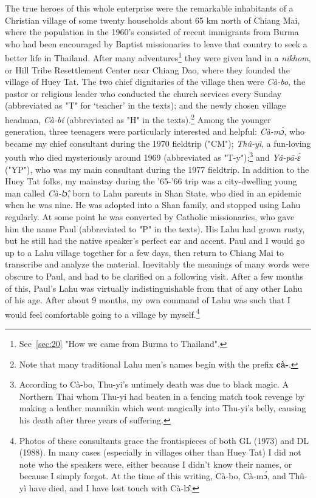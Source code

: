 The true heroes of this whole enterprise were the remarkable
inhabitants of a Christian village of some twenty households about 65
km north of Chiang Mai, where the population in the 1960's consisted
of recent immigrants from Burma who had been encouraged by Baptist
missionaries to leave that country to seek a better life in
Thailand. After many adventures\footnote{See~\ref{sec:20} "How we came
  from Burma to Thailand".} they were given land in a \emph{nikhom},
or Hill Tribe Resettlement Center near Chiang Dao, where they founded
the village of Huey Tat. The two chief dignitaries of the village then
were \emph{Cà-bo}, the pastor or religious leader who conducted the
church services every Sunday (abbreviated as "T" for `teacher' in the
texts); and the newly chosen village headman, \emph{Cà-bí}
(abbreviated as "H" in the texts).\footnote{Note that many traditional
  Lahu men's names begin with the prefix \textbf{cà-}.}  Among the
younger generation, three teenagers were particularly interested and
helpful: \emph{Cà-mɔ́}, who became my chief consultant during the 1970
fieldtrip ("CM"); \emph{Thû-yì}, a fun-loving youth who died
mysteriously around 1969 (abbreviated as "T-y");\footnote{According to
  Cà-bo, Thu-yi's untimely death was due to black magic. A Northern
  Thai whom Thu-yi had beaten in a fencing match took revenge by
  making a leather mannikin which went magically into Thu-yi's belly,
  causing his death after three years of suffering.} and \emph{Yâ-pā-ɛ́
}("YP"), who was my main consultant during the 1977 fieldtrip. In
addition to the Huey Tat folks, my mainstay during the '65-'66 trip
was a city-dwelling young man called \emph{Cà-lɔ̂}, born to Lahu
parents in Shan State, who died in an epidemic when he was nine. He
was adopted into a Shan family, and stopped using Lahu regularly. At
some point he was converted by Catholic missionaries, who gave him the
name Paul (abbreviated to "P" in the texts). His Lahu had grown rusty,
but he still had the native speaker's perfect ear and accent. Paul and
I would go up to a Lahu village together for a few days, then return
to Chiang Mai to transcribe and analyze the material. Inevitably the
meanings of many words were obscure to Paul, and had to be clarified
on a following visit. After a few months of this, Paul's Lahu was
virtually indistinguishable from that of any other Lahu of his
age. After about 9 months, my own command of Lahu was such that I
would feel comfortable going to a village by myself.\footnote{Photos
  of these consultants grace the frontispieces of both GL (1973) and
  DL (1988). In many cases (especially in villages other than Huey
  Tat) I did not note who the speakers were, either because I didn't
  know their names, or because I simply forgot. At the time of this
  writing, Cà-bo, Cà-mɔ́, and Thû-yì have died, and I have lost touch
  with Cà-lɔ̂.}

